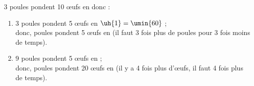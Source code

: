    3 poules pondent 10 \oe ufs en  donc : \\
   \begin{enumerate}
      \item 3 poules pondent 5 \oe ufs en $\uh{1} =\umin{60}$ ; \\
         donc, { poules pondent 5 \oe ufs en } (il faut 3 fois plus de poules pour 3 fois moins de temps). \\
      \item 9 poules pondent 5 \oe ufs en  ; \\
         donc, { poules pondent 20 \oe ufs en } (il y a 4 fois plus d'\oe ufs, il faut 4 fois plus de temps). \\ [5cm]
   \end{enumerate}
